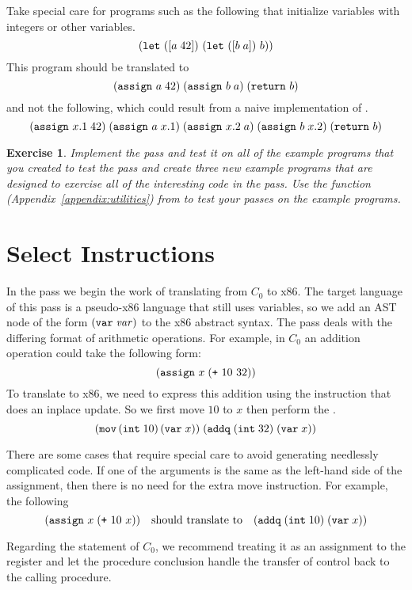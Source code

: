 \documentclass[12pt]{book}
\newtheorem{exercise}[theorem]{Exercise}
\begin{document}
Take special care for programs such as the following that initialize
variables with integers or other variables.
\[
(\texttt{let}~([a\;42])~ (\texttt{let}~([b\;a])~ b ))
\]
This program should be translated to 
\[
(\texttt{assign}~a\;42) \;
(\texttt{assign}~b\;a) \;
(\texttt{return}~b)
\]
and not the following, which could result from a naive implementation
of .
\[
(\texttt{assign}~x.1\;42)\;
(\texttt{assign}~a\;x.1)\;
(\texttt{assign}~x.2\;a)\;
(\texttt{assign}~b\;x.2)\;
(\texttt{return}~b)
\]

\begin{exercise}
\normalfont
Implement the  pass and test it on all of the example
programs that you created to test the  pass and create
three new example programs that are designed to exercise all of the
interesting code in the  pass. Use the 
function (Appendix~\ref{appendix:utilities}) from  to
test your passes on the example programs.
\end{exercise}


\section{Select Instructions}
\label{sec:select-s0}

In the  pass we begin the work of
translating from $C_0$ to x86. The target language of this pass is a
pseudo-x86 language that still uses variables, so we add an AST node
of the form $(\texttt{var}\;\mathit{var})$ to the x86 abstract syntax.  The
 pass deals with the differing format of
arithmetic operations. For example, in $C_0$ an addition operation
could take the following form:
\[
(\texttt{assign}~x\; (\texttt{+}~10~32) )
\]
To translate to x86, we need to express this addition using the
 instruction that does an inplace update. So we first move
$10$ to $x$ then perform the .
\[
(\texttt{mov}\,(\texttt{int}\;10)\, (\texttt{var}\;x))\; (\texttt{addq} \;(\texttt{int}\;32)\; (\texttt{var}\;x))
\]

There are some cases that require special care to avoid generating
needlessly complicated code. If one of the arguments is the same as
the left-hand side of the assignment, then there is no need for the
extra move instruction.  For example, the following
\[
(\texttt{assign}~x\; (\texttt{+}~10~x) )
\quad\text{should translate to}\quad
(\texttt{addq} \; (\texttt{int}\;10)\; (\texttt{var}\;x))
\]

Regarding the  statement of $C_0$, we recommend treating it
as an assignment to the  register and let the procedure
conclusion handle the transfer of control back to the calling
procedure.
\end{document}
